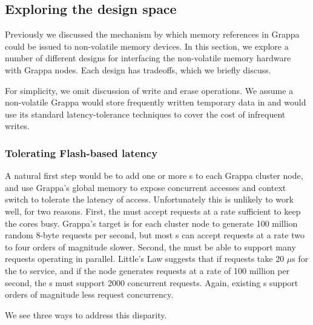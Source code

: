 \subsection{Exploring the design space}

Previously we discussed the mechanism by which memory references in
Grappa could be issued to non-volatile memory devices. In this
section, we explore a number of different designs for interfacing the
non-volatile memory hardware with Grappa nodes. Each design has
tradeoffs, which we briefly discuss.

For simplicity, we omit discussion of write and erase operations. We
assume a non-volatile Grappa would store frequently written temporary
data in  and would use its standard latency-tolerance techniques
to cover the cost of infrequent writes.

\subsubsection{Tolerating Flash-based  latency} 
A natural first step would be to add one or more \hspace{0.75pt}s to each Grappa
cluster node, and use Grappa's global memory  to expose concurrent
accesses and context switch to tolerate the latency of 
access. Unfortunately this is unlikely to work well, for two
reasons. First, the  must accept requests at a rate sufficient to
keep the cores busy. Grappa's target is for each cluster node to
generate 100 million random 8-byte requests per second, but most \hspace{0.75pt}s
can accept requests at a rate two to four orders of magnitude slower.
Second, the  must be able to support many requests operating in
parallel. Little's Law suggests that if requests take 20 $\mu$s for
the  to service, and if the node generates requests at a rate of
100 million per second, the \hspace{0.75pt}s must support 2000 concurrent
requests. Again, existing \hspace{0.75pt}s support orders of magnitude less request concurrency.

We see three ways to address this disparity.


